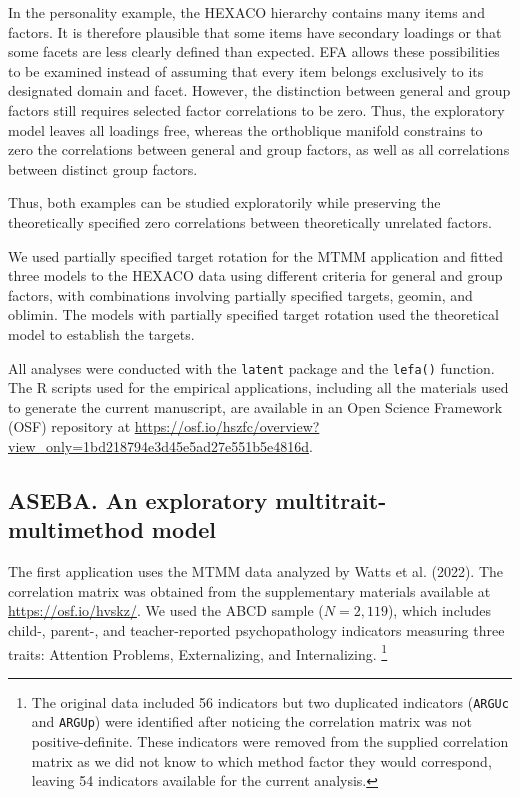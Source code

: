 \documentclass[
  12pt,
  letterpaper,
  article]{scrartcl}
\begin{document}
In the personality example, the HEXACO hierarchy contains many items and
factors. It is therefore plausible that some items have secondary
loadings or that some facets are less clearly defined than expected. EFA
allows these possibilities to be examined instead of assuming that every
item belongs exclusively to its designated domain and facet. However,
the distinction between general and group factors still requires
selected factor correlations to be zero. Thus, the exploratory model
leaves all loadings free, whereas the orthoblique manifold constrains to
zero the correlations between general and group factors, as well as all
correlations between distinct group factors.

Thus, both examples can be studied exploratorily while preserving the
theoretically specified zero correlations between theoretically
unrelated factors.

We used partially specified target rotation for the MTMM application and
fitted three models to the HEXACO data using different criteria for
general and group factors, with combinations involving partially
specified targets, geomin, and oblimin. The models with partially
specified target rotation used the theoretical model to establish the
targets.

All analyses were conducted with the \texttt{latent} package and the
\texttt{lefa()} function. The R scripts used for the empirical
applications, including all the materials used to generate the current
manuscript, are available in an Open Science Framework (OSF) repository
at
\url{https://osf.io/hszfc/overview?view_only=1bd218794e3d45e5ad27e551b5e4816d}.

\subsection{ASEBA. An exploratory multitrait-multimethod
model}\label{aseba.-an-exploratory-multitrait-multimethod-model}

The first application uses the MTMM data analyzed by Watts et al.
(2022). The correlation matrix was obtained from the supplementary
materials available at \url{https://osf.io/hvskz/}. We used the ABCD
sample (\(N=2,119\)), which includes child-, parent-, and
teacher-reported psychopathology indicators measuring three traits:
Attention Problems, Externalizing, and Internalizing. \footnote{The
  original data included 56 indicators but two duplicated indicators
  (\texttt{ARGUc} and \texttt{ARGUp}) were identified after noticing the
  correlation matrix was not positive-definite. These indicators were
  removed from the supplied correlation matrix as we did not know to
  which method factor they would correspond, leaving 54 indicators
  available for the current analysis.}
\end{document}
